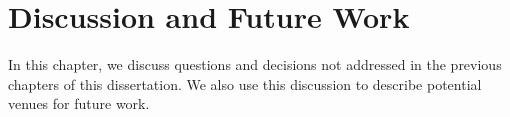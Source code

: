 \setcounter{chapter}{6}


\chapter{Discussion and Future Work}
\label{ch:discussion}


In this chapter, we discuss questions
and decisions not addressed in the previous chapters of this dissertation. 
We also use this discussion to describe potential venues for future work.




 










% 
% 

